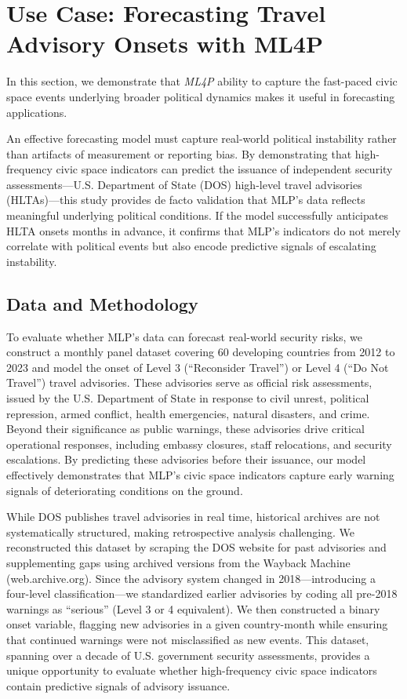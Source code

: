 \documentclass[
  letterpaper,
  DIV=11,
  numbers=noendperiod]{scrartcl}
\begin{document}
\hypertarget{sec-usecase}{%
\section{Use Case: Forecasting Travel Advisory Onsets with
ML4P}\label{sec-usecase}}

In this section, we demonstrate that \emph{ML4P} ability to capture the
fast-paced civic space events underlying broader political dynamics
makes it useful in forecasting applications.

An effective forecasting model must capture real-world political
instability rather than artifacts of measurement or reporting bias. By
demonstrating that high-frequency civic space indicators can predict the
issuance of independent security assessments---U.S. Department of State
(DOS) high-level travel advisories (HLTAs)---this study provides de
facto validation that MLP's data reflects meaningful underlying
political conditions. If the model successfully anticipates HLTA onsets
months in advance, it confirms that MLP's indicators do not merely
correlate with political events but also encode predictive signals of
escalating instability.

\hypertarget{data-and-methodology}{%
\subsection{Data and Methodology}\label{data-and-methodology}}

To evaluate whether MLP's data can forecast real-world security risks,
we construct a monthly panel dataset covering 60 developing countries
from 2012 to 2023 and model the onset of Level 3 (``Reconsider Travel'')
or Level 4 (``Do Not Travel'') travel advisories. These advisories serve
as official risk assessments, issued by the U.S. Department of State in
response to civil unrest, political repression, armed conflict, health
emergencies, natural disasters, and crime. Beyond their significance as
public warnings, these advisories drive critical operational responses,
including embassy closures, staff relocations, and security escalations.
By predicting these advisories before their issuance, our model
effectively demonstrates that MLP's civic space indicators capture early
warning signals of deteriorating conditions on the ground.

While DOS publishes travel advisories in real time, historical archives
are not systematically structured, making retrospective analysis
challenging. We reconstructed this dataset by scraping the DOS website
for past advisories and supplementing gaps using archived versions from
the Wayback Machine (web.archive.org). Since the advisory system changed
in 2018---introducing a four-level classification---we standardized
earlier advisories by coding all pre-2018 warnings as ``serious'' (Level
3 or 4 equivalent). We then constructed a binary onset variable,
flagging new advisories in a given country-month while ensuring that
continued warnings were not misclassified as new events. This dataset,
spanning over a decade of U.S. government security assessments, provides
a unique opportunity to evaluate whether high-frequency civic space
indicators contain predictive signals of advisory issuance.
\end{document}
